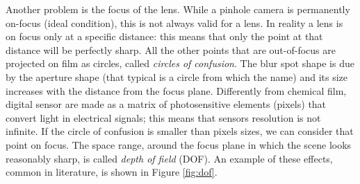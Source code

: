 Another problem is the focus of the lens. While a pinhole camera is permanently on-focus (ideal condition), this is not always valid for a lens. In reality a lens is on focus only at a specific distance: this means that only the point at that distance will be perfectly sharp. All the other points that are out-of-focus are projected on film as circles, called \textit{circles of confusion}. The blur spot shape is due by the aperture shape (that typical is a circle from which the name) and its size increases with the distance from the focus plane. Differently from chemical film, digital sensor are made as a matrix of photosensitive elements (pixels) that convert light in electrical signals; this means that sensors resolution is not infinite. If the circle of confusion is smaller than pixels sizes, we can consider that point on focus. The space range, around the focus plane in which the scene looks reasonably sharp, is called \textit{depth of field} (\acs{DOF}). An example of these effects, common in literature, is shown in Figure \ref{fig:dof}.

